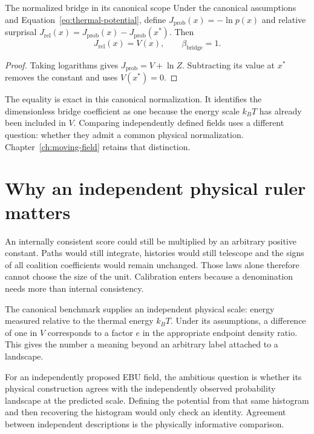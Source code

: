 \begin{corollary}{The normalized bridge in its canonical scope}\label{cor:beta-one}
Under the canonical assumptions and Equation~\ref{eq:thermal-potential}, define $J_{\mathrm{prob}}(x)=-\ln p(x)$ and relative surprisal
$J_{\mathrm{rel}}(x)=J_{\mathrm{prob}}(x)-J_{\mathrm{prob}}(x^*)$. Then
\begin{equation}\label{eq:relative-surprisal}
 J_{\mathrm{rel}}(x)=V(x),\qquad \beta_{\mathrm{bridge}}=1.
\end{equation}
\end{corollary}
\begin{proof}
Taking logarithms gives $J_{\mathrm{prob}}=V+\ln Z$. Subtracting its value at $x^*$ removes the constant and uses $V(x^*)=0$.
\end{proof}

The equality is exact in this canonical normalization. It identifies the dimensionless bridge coefficient as one because the energy scale $k_BT$ has already been included in $V$. Comparing independently defined fields uses a different question: whether they admit a common physical normalization. Chapter~\ref{ch:moving-field} retains that distinction.

\section{Why an independent physical ruler matters}
An internally consistent score could still be multiplied by an arbitrary positive constant. Paths would still integrate, histories would still telescope and the signs of all coalition coefficients would remain unchanged. Those laws alone therefore cannot choose the size of the unit. Calibration enters because a denomination needs more than internal consistency.

The canonical benchmark supplies an independent physical scale: energy measured relative to the thermal energy $k_BT$. Under its assumptions, a difference of one in $V$ corresponds to a factor $e$ in the appropriate endpoint density ratio. This gives the number a meaning beyond an arbitrary label attached to a landscape.

For an independently proposed EBU field, the ambitious question is whether its physical construction agrees with the independently observed probability landscape at the predicted scale. Defining the potential from that same histogram and then recovering the histogram would only check an identity. Agreement between independent descriptions is the physically informative comparison.

